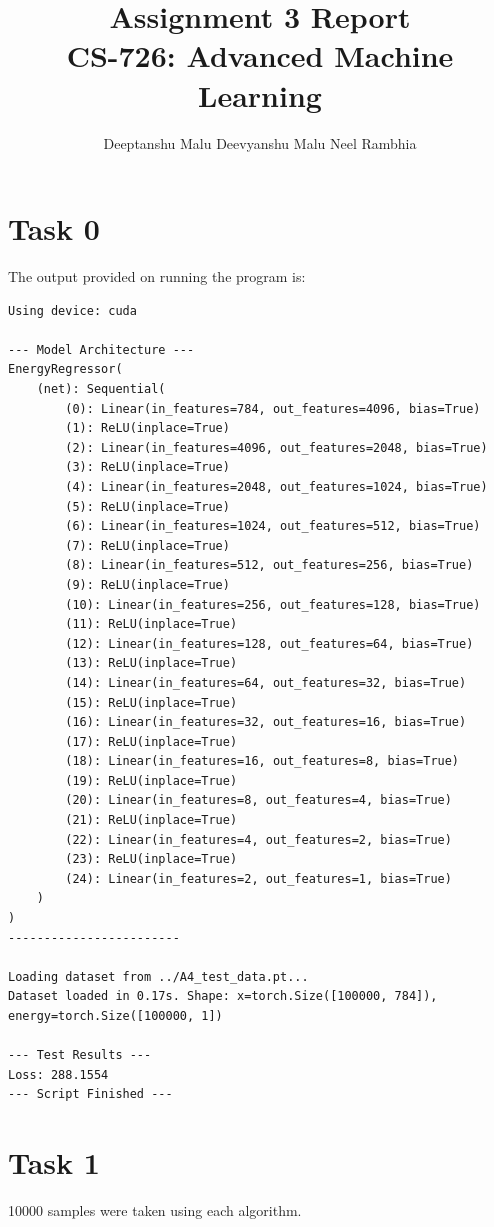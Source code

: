 \documentclass[11pt]{article}
\title{Assignment 3 Report\\
    CS-726: Advanced Machine Learning}
\author{Deeptanshu Malu \quad Deevyanshu Malu \quad Neel Rambhia}
\date{}
\begin{document}
\maketitle

\section{Task 0}

The output provided on running the program is:

\begin{verbatim}
Using device: cuda

--- Model Architecture ---
EnergyRegressor(
    (net): Sequential(
        (0): Linear(in_features=784, out_features=4096, bias=True)
        (1): ReLU(inplace=True)
        (2): Linear(in_features=4096, out_features=2048, bias=True)
        (3): ReLU(inplace=True)
        (4): Linear(in_features=2048, out_features=1024, bias=True)
        (5): ReLU(inplace=True)
        (6): Linear(in_features=1024, out_features=512, bias=True)
        (7): ReLU(inplace=True)
        (8): Linear(in_features=512, out_features=256, bias=True)
        (9): ReLU(inplace=True)
        (10): Linear(in_features=256, out_features=128, bias=True)
        (11): ReLU(inplace=True)
        (12): Linear(in_features=128, out_features=64, bias=True)
        (13): ReLU(inplace=True)
        (14): Linear(in_features=64, out_features=32, bias=True)
        (15): ReLU(inplace=True)
        (16): Linear(in_features=32, out_features=16, bias=True)
        (17): ReLU(inplace=True)
        (18): Linear(in_features=16, out_features=8, bias=True)
        (19): ReLU(inplace=True)
        (20): Linear(in_features=8, out_features=4, bias=True)
        (21): ReLU(inplace=True)
        (22): Linear(in_features=4, out_features=2, bias=True)
        (23): ReLU(inplace=True)
        (24): Linear(in_features=2, out_features=1, bias=True)
    )
)
------------------------

Loading dataset from ../A4_test_data.pt...
Dataset loaded in 0.17s. Shape: x=torch.Size([100000, 784]), energy=torch.Size([100000, 1])

--- Test Results ---
Loss: 288.1554
--- Script Finished ---
\end{verbatim}

\section{Task 1}

10000 samples were taken using each algorithm.
\end{document}

